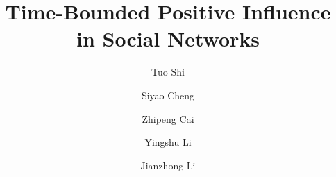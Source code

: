 %
%
%
%
%
%
\RequirePackage{fix-cm}
%
\documentclass[smallcondensed]{svjour3}     %
%
\smartqed  %
%
\usepackage{graphicx}
%
%
\usepackage{algorithm}
\usepackage{algorithmicx}
\usepackage{algpseudocode}
\usepackage{amssymb, amsmath}
\usepackage{footmisc}
\usepackage{graphicx}
\usepackage{subfigure}
\usepackage{indentfirst}
%
%

\title{Time-Bounded Positive Influence in Social Networks}


\author{Tuo Shi   \and
        Siyao Cheng \and
        Zhipeng Cai \and
        Yingshu Li \and
        Jianzhong Li %
}


